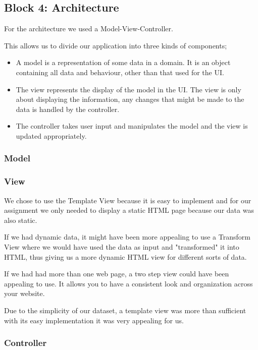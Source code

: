 \documentclass[a4paper,12pt]{article}
\begin{document}
\subsection{Block 4: Architecture}

For the architecture we used a Model-View-Controller.

This allows us to divide our application into three kinds of components;

\begin{itemize}
\item A model is a representation of some data in a domain. It is an object containing all data and behaviour, other than that used for the UI. 
\item The view represents the display of the model in the UI. The view is only about displaying the information, any changes that might be made to the data is handled by the controller. 
\item The controller takes user input and manipulates the model and the view is updated appropriately. 
\end{itemize}

\subsubsection*{Model}

\subsubsection*{View}
We chose to use the Template View because it is easy to implement and for our assignment we only needed to display a static HTML page because our data was also static.

If we had dynamic data, it might have been more appealing to use a Transform View where we would have used the data as input and "transformed" it into HTML, thus giving us a more dynamic HTML view for different sorts of data.

If we had had more than one web page, a two step view could have been appealing to use. It allows you to have a consistent look and organization across your website. 

Due to the simplicity of our dataset, a template view was more than sufficient with its easy implementation it was very appealing for us. 

\subsubsection*{Controller}
\end{document}
